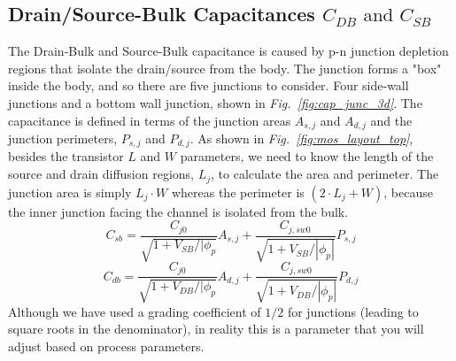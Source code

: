 \subsection{Drain/Source-Bulk Capacitances \texorpdfstring{$C_{DB}\text{ and }C_{SB}$}{}}
The Drain-Bulk and Source-Bulk capacitance is caused by p-n junction depletion regions that isolate the drain/source from the body. The junction forms a "box" inside the body, and so there are five junctions to consider. Four side-wall junctions and a bottom wall junction, shown in \emph{Fig.~\ref{fig:cap_junc_3d}}.  The capacitance is defined in terms of the junction areas $A_{s,j}$ and $A_{d,j}$ and the junction perimeters, $P_{s,j}$ and $P_{d,j}$.  As shown in  \emph{Fig.~\ref{fig:mos_layout_top}}, besides the transistor $L$ and $W$ parameters, we need to know the length of the source and drain diffusion regions, $L_j$, to calculate the area and perimeter.  The junction area is simply $L_j \cdot W$ whereas the perimeter is $(2\cdot L_j + W)$, because the inner junction facing the channel is isolated from the bulk.
    \begin{equation}
        C_{sb} = \frac{C_{j0}}{\sqrt{ 1 + V_{SB}/|\phi_{p}}}  A_{s,j} + \frac{C_{j,sw0}}{\sqrt{ 1 + V_{SB}/|\phi_p|}} P_{s,j}
    \end{equation}
    \begin{equation}
        C_{db} = \frac{C_{j0}}{\sqrt{ 1 + V_{DB}/|\phi_{p}}}  A_{d,j} + \frac{C_{j,sw0}}{\sqrt{ 1 + V_{DB}/|\phi_p|}} P_{d,j}
    \end{equation}
Although we have used a grading coefficient of $1/2$ for junctions (leading to square roots in the denominator), in reality this is a parameter that you will adjust based on process parameters.
